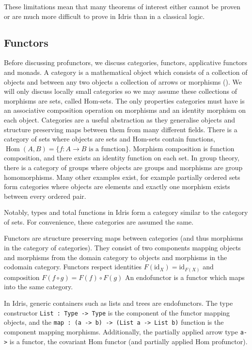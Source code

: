 \documentclass[11pt]{report}
\begin{document}
\begin{spacing}{1.15}
These limitations mean that many theorems of interest either cannot be proven or are much more difficult to prove in Idris than in a classical logic.

\subsection{Functors}

Before discussing profunctors, we discuss categories, functors, applicative functors and monads. A category is a mathematical object which consists of a collection of objects and between any two objects a collection of arrows or morphisms (\cite{mac1970categories}). We will only discuss locally small categories so we may assume these collections of morphisms are sets, called Hom-sets. The only properties categories must have is an associative composition operation on morphisms and an identity morphism on each object. Categories are a useful abstraction as they generalise objects and structure preserving maps between them from many different fields. There is a category of sets where objects are sets and Hom-sets contain functions, $\operatorname{Hom}(A,B)=\{ f : A\to B\text{ is a function} \}$. Morphism composition is function composition, and there exists an identity function on each set. In group theory, there is a category of groups where objects are groups and morphisms are group homomorphisms. Many other examples exist, for example partially ordered sets form categories where objects are elements and exactly one morphism exists between every ordered pair.

Notably, types and total functions in Idris form a category similar to the category of sets. For convenience, these categories are assumed the same.

Functors are structure preserving maps between categories (and thus morphisms in the category of categories). They consist of two components mapping objects and morphisms from the domain category to objects and morphisms in the codomain category. Functors respect identities $F(\text{id}_X)=\text{id}_{F(X)}$ and composition $F(f\circ g)=F(f)\circ F(g)$ An endofunctor is a functor which maps into the same category.

In Idris, generic containers such as lists and trees are endofunctors. The type constructor \texttt{List : Type -> Type} is the component of the functor mapping objects, and the \texttt{map : (a -> b) -> (List a -> List b)} function is the component mapping morphisms. Additionally, the partially applied arrow type \texttt{a->} is a functor, the covariant Hom functor (and partially applied Hom profunctor).


\end{spacing}
\end{document}
